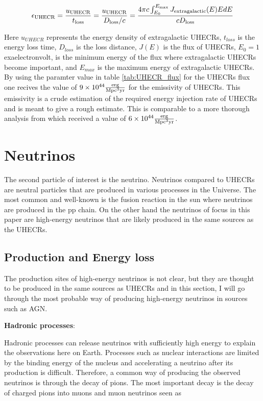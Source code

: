 \begin{equation}
    \epsilon_{\rm UHECR} = \frac{u_{\rm UHECR}}{t_{\rm loss}} = \frac{u_{\rm UHECR}}{D_{\rm loss}/c} = \frac{4\pi c \int_{E_0}^{E_{\rm max}}J_{\rm extragalactic}(E)E dE}{c D_{\rm loss}} %
\end{equation}

Here $u_{UHECR}$ represents the energy density of extragalactic UHECRs, $t_{loss}$ is the energy loss time, $D_{loss}$ is the loss distance, $J(E)$ is the flux of UHECRs, $E_0 = 1$ exaelectronvolt, is the minimum energy of the flux where extragalactic UHECRs become important, and $E_{max}$ is the maximum energy of extragalactic UHECRs.
By using the paramter value in table \ref{tab:UHECR_flux} for the UHECRs flux one recives the value of $9 \times  10^{44} \frac{\rm erg}{\rm Mpc^3 \rm yr}$ for the emissivity of UHECRs.
This emissivity is a crude estimation of the required energy injection rate of UHECRs and is meant to give a rough estimate. This is comparable to a more thorough analysis from \cite{PhysRevLett.125.121106} which received a value of $6 \times 10^{44} \frac{\rm erg}{\rm Mpc^3 \rm yr}$.




\section{Neutrinos}

The second particle of interest is the neutrino. Neutrinos compared to UHECRs are neutral particles that are produced in various processes in the Universe.
The most common and well-known is the fusion reaction in the sun where neutrinos are produced in the pp chain. On the other hand the neutrinos of focus in this paper 
are high-energy neutrinos that are likely produced in the same sources as the UHECRs.



\subsection{Production and Energy loss}
The production sites of high-energy neutrinos is not clear, but they are thought to be produced in the same sources as UHECRs 
and in this section, I will go through the most probable way of producing high-energy neutrinos in sources such as AGN.

\textbf{Hadronic processes}:

Hadronic processes can release neutrinos with sufficiently high energy to explain the observations here on Earth. 
Processes such as nuclear interactions are limited by the binding energy of the nucleus and accelerating a neutrino after its production is difficult.
Therefore, a common way of producing the observed neutrinos is through the decay of pions. The most important decay is the decay of charged pions into muons and muon neutrinos seen as


